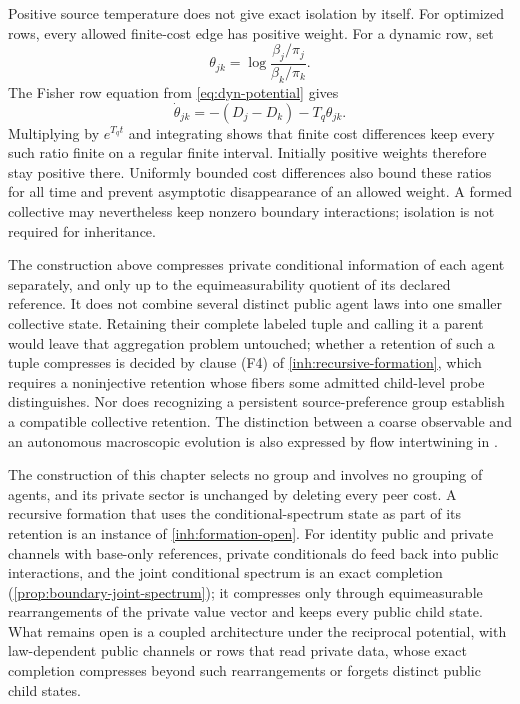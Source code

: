 Positive source temperature does not give exact isolation by itself. For optimized rows, every allowed finite-cost edge has positive weight. For a dynamic row, set
\begin{equation}
 \theta_{jk}=\log\frac{\beta_j/\pi_j}{\beta_k/\pi_k}.
\end{equation}
The Fisher row equation from \cref{eq:dyn-potential} gives
\begin{equation}
 \dot\theta_{jk}=-(D_j-D_k)-T_q\theta_{jk}.
 \label{smooth:row-ratio}
\end{equation}
Multiplying by $e^{T_qt}$ and integrating shows that finite cost differences keep every such ratio finite on a regular finite interval. Initially positive weights therefore stay positive there. Uniformly bounded cost differences also bound these ratios for all time and prevent asymptotic disappearance of an allowed weight. A formed collective may nevertheless keep nonzero boundary interactions; isolation is not required for inheritance.

The construction above compresses private conditional information of each agent separately, and only up to the equimeasurability quotient of its declared reference. It does not combine several distinct public agent laws into one smaller collective state. Retaining their complete labeled tuple and calling it a parent would leave that aggregation problem untouched; whether a retention of such a tuple compresses is decided by clause (F4) of \cref{inh:recursive-formation}, which requires a noninjective retention whose fibers some admitted child-level probe distinguishes. Nor does recognizing a persistent source-preference group establish a compatible collective retention. The distinction between a coarse observable and an autonomous macroscopic evolution is also expressed by flow intertwining in \citet{BarnettSeth2023}.

The construction of this chapter selects no group and involves no grouping of agents, and its private sector is unchanged by deleting every peer cost. A recursive formation that uses the conditional-spectrum state as part of its retention is an instance of \cref{inh:formation-open}. For identity public and private channels with base-only references, private conditionals do feed back into public interactions, and the joint conditional spectrum is an exact completion (\cref{prop:boundary-joint-spectrum}); it compresses only through equimeasurable rearrangements of the private value vector and keeps every public child state. What remains open is a coupled architecture under the reciprocal potential, with law-dependent public channels or rows that read private data, whose exact completion compresses beyond such rearrangements or forgets distinct public child states.
